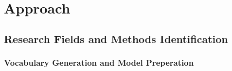 \documentclass[runningheads]{llncs}
\begin{document}
	\section{Approach}
	
	
	\subsection{Research Fields and Methods Identification}
	\subsubsection{Vocabulary Generation and Model Preperation}
	\smallskip
\end{document}
